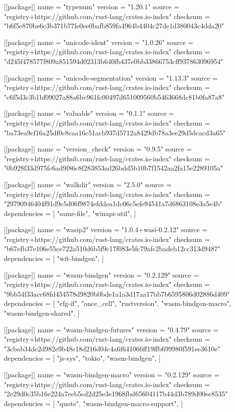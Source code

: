 [[package]]
name = "typenum"
version = "1.20.1"
source = "registry+https://github.com/rust-lang/crates.io-index"
checksum = "b6f5e870be6c3b371b77fe0ee0bafb859fa4964b4404c27de1d380043c4dda20"

[[package]]
name = "unicode-ident"
version = "1.0.26"
source = "registry+https://github.com/rust-lang/crates.io-index"
checksum = "d245f478577f809a851594d02313b640fb437e0bb33866753cff937863096954"

[[package]]
name = "unicode-segmentation"
version = "1.13.3"
source = "registry+https://github.com/rust-lang/crates.io-index"
checksum = "c6f5d3c3b1bf09027a88a6bc961fc00497d651009560b5463668dc81b0fa87a8"

[[package]]
name = "valuable"
version = "0.1.1"
source = "registry+https://github.com/rust-lang/crates.io-index"
checksum = "ba73ea9cf16a25df0c8caa16c51acb937d5712a8429db78a3ee29d5dcacd3a65"

[[package]]
name = "version_check"
version = "0.9.5"
source = "registry+https://github.com/rust-lang/crates.io-index"
checksum = "0b928f33d975fc6ad9f86c8f283853ad26bdd5b10b7f1542aa2fa15e2289105a"

[[package]]
name = "walkdir"
version = "2.5.0"
source = "registry+https://github.com/rust-lang/crates.io-index"
checksum = "29790946404f91d9c5d06f9874efddea1dc06c5efe94541a7d6863108e3a5e4b"
dependencies = [
 "same-file",
 "winapi-util",
]

[[package]]
name = "wasip2"
version = "1.0.4+wasi-0.2.12"
source = "registry+https://github.com/rust-lang/crates.io-index"
checksum = "b67efb37e106e55ce722a510d6b5f9c17f083e5fc79afc2badeb12cc313d9487"
dependencies = [
 "wit-bindgen",
]

[[package]]
name = "wasm-bindgen"
version = "0.2.129"
source = "registry+https://github.com/rust-lang/crates.io-index"
checksum = "9bb54f33acc68fd454578d9820b0bde1a1a3d17aa17bb7b6595806d02886d409"
dependencies = [
 "cfg-if",
 "once_cell",
 "rustversion",
 "wasm-bindgen-macro",
 "wasm-bindgen-shared",
]

[[package]]
name = "wasm-bindgen-futures"
version = "0.4.79"
source = "registry+https://github.com/rust-lang/crates.io-index"
checksum = "3cbab34de2d982e9b48e18d216d04c4a6f641066ff19ffb699980f591ee3610e"
dependencies = [
 "js-sys",
 "tokio",
 "wasm-bindgen",
]

[[package]]
name = "wasm-bindgen-macro"
version = "0.2.129"
source = "registry+https://github.com/rust-lang/crates.io-index"
checksum = "2e29d0c35b16e224a7eeb5cd2d25e3e1968fbd65604117b44d3b789d00ee8535"
dependencies = [
 "quote",
 "wasm-bindgen-macro-support",
]

